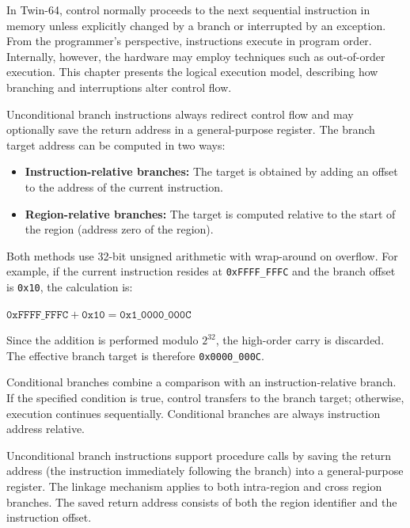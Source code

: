 
In Twin-64, control normally proceeds to the next sequential instruction in memory unless explicitly changed by a branch or interrupted by an exception. From the programmer’s perspective, instructions execute in program order. Internally, however, the hardware may employ techniques such as out-of-order execution. This chapter presents the logical execution model, describing how branching and interruptions alter control flow.


Unconditional branch instructions always redirect control flow and may optionally save the return address in a general-purpose register. The branch target address can be computed in two ways:
\begin{itemize}
\setlength{\itemsep}{0.5em}
\setlength{\parskip}{0pt}
\item \textbf{Instruction-relative branches:} The target is obtained by adding an offset to the address of the current instruction.
\item \textbf{Region-relative branches:} The target is computed relative to the start of the region (address zero of the region).
\end{itemize}
Both methods use 32-bit unsigned arithmetic with wrap-around on overflow. For example, if the current instruction resides at \texttt{0xFFFF\_FFFC} and the branch offset is \texttt{0x10}, the calculation is:

\begin{flushleft}
\hspace*{2em}$\texttt{0xFFFF\_FFFC} + \texttt{0x10} = \texttt{0x1\_0000\_000C}$
\end{flushleft}

Since the addition is performed modulo $2^{32}$, the high-order carry is discarded. The effective branch target is therefore \texttt{0x0000\_000C}.


Conditional branches combine a comparison with an instruction-relative branch. If the specified condition is true, control transfers to the branch target; otherwise, execution continues sequentially. Conditional branches are always instruction address relative.


Unconditional branch instructions support procedure calls by saving the return address (the instruction immediately following the branch) into a general-purpose register. The linkage mechanism applies to both intra-region and cross region branches. The saved return address consists of both the region identifier and the instruction offset.

